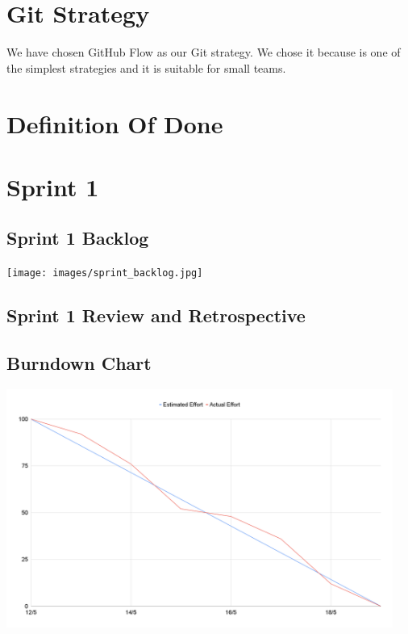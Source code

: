 \documentclass{article}
\begin{document}
\section{Git Strategy}

We have chosen GitHub Flow as our Git strategy.
We chose it because is one of the simplest strategies and it is suitable for small teams.

\section{Definition Of Done}

\section{Sprint 1}

\subsection{Sprint 1 Backlog}
  \texttt{[image: images/sprint\_backlog.jpg]}

\subsection{Sprint 1 Review and Retrospective}

\subsection{Burndown Chart}
  \includegraphics[width=0.95\textwidth]{images/burndown_chart.png}
\end{document}
